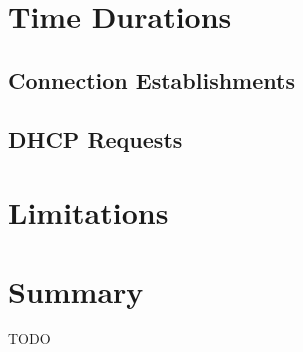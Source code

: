 \section{Time Durations}

\subsection{Connection Establishments}


\subsection{DHCP Requests}


\section{Limitations}


\section{Summary}

TODO
